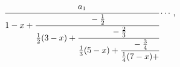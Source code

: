 \[\cfrac{a_{1}}{1-x+\cfrac{-\frac{1}{2}}{\frac{1}{2}(3-x)+\cfrac{-\frac{2}{3}}{%
\frac{1}{3}(5-x)+\cfrac{-\frac{3}{4}}{\frac{1}{4}(7-x)+}}}}\cdots,\]